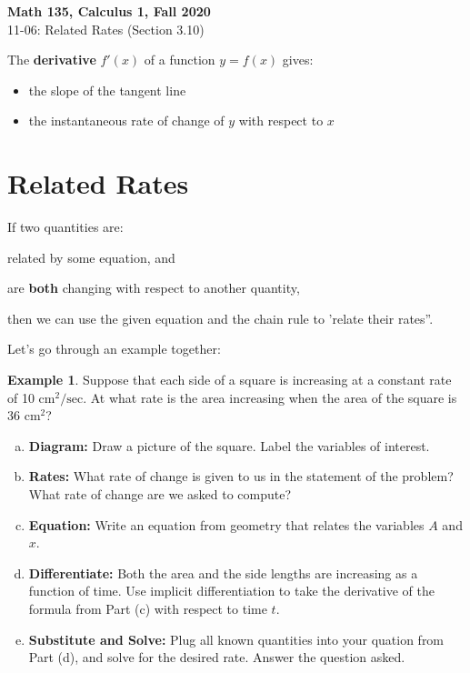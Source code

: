 \documentclass[11pt,reqno,final]{amsart}
\numberwithin{figure}{section}
\theoremstyle{definition} %
\newtheorem{example}[equation]{Example}%
\begin{document}
\begin{center}
        \textbf{\Large Math 135, Calculus 1, Fall 2020}\\[10pt]
        {\large 11-06:  Related Rates (Section 3.10)}
\end{center}

\thispagestyle{empty}


\renewcommand{\thesection}{\Alph{section}}


The \textbf{derivative} $f'(x)$ of a function $y=f(x)$ gives:
\begin{itemize}
\item the slope of the tangent line
\item the instantaneous rate of change of $y$ with respect to $x$
\end{itemize}


\section{Related Rates}

If two quantities are:
\begin{enumerate*}[(i)]
\item related by some equation, and
\item are \textbf{both} changing with respect to another quantity,
\end{enumerate*}
then we can use the given equation and the chain rule to 'relate their rates''.


Let's go through an example together:
\begin{example}      
        Suppose that each side of a square is increasing at a constant rate of 10 $\mathrm{cm}^2/\mathrm{sec}$.
        At what rate is the area increasing when the area of the square is 36 cm$^2$?
        \begin{enumerate}[(a)]
        \item \textbf{Diagram:} Draw a picture of the square. Label the variables of interest.
                \vfill
        \item \textbf{Rates:} What rate of change is given to us in the statement of the problem?
                What rate of change are we asked to compute?
                \vfill
        \item \textbf{Equation:} Write an equation from geometry that relates the variables $A$ and $x$.
                \vfill
        \item \textbf{Differentiate:} Both the area and the side lengths are increasing as a function of time.
                Use implicit differentiation to take the derivative of the formula from Part (c) with respect to time $t$.
                \vfill
        \item \textbf{Substitute and Solve:} Plug all known quantities into your quation from Part (d),
                and solve for the desired rate. Answer the question asked.
                \vfill
        \end{enumerate}
\end{example}
\end{document}
